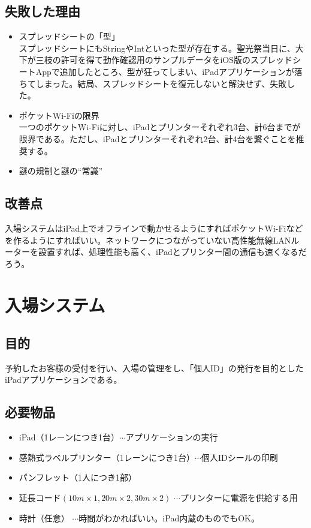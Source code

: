 \documentclass[dvipdfmx,jb5]{jreport}
\begin{document}
\subsection{失敗した理由}
\begin{itemize}
      \item スプレッドシートの「型」\\
            スプレッドシートにもStringやIntといった型が存在する。聖光祭当日に、大下が三枝の許可を得て動作確認用のサンプルデータをiOS版のスプレッドシートAppで追加したところ、型が狂ってしまい、iPadアプリケーションが落ちてしまった。結局、スプレッドシートを復元しないと解決せず、失敗した。
      \item ポケットWi-Fiの限界\\
            一つのポケットWi-Fiに対し、iPadとプリンターそれぞれ3台、計6台までが限界である。ただし、iPadとプリンターそれぞれ2台、計4台を繋ぐことを推奨する。
      \item 謎の規制と謎の``常識''
\end{itemize}

\subsection{改善点}
入場システムはiPad上でオフラインで動かせるようにすればポケットWi-Fiなどを作るようにすればいい。ネットワークにつながっていない高性能無線LANルーターを設置すれば、処理性能も高く、iPadとプリンター間の通信も速くなるだろう。
\section{入場システム}
\subsection{目的}
予約したお客様の受付を行い、入場の管理をし、「個人ID」の発行を目的としたiPadアプリケーションである。
\subsection{必要物品}
\begin{itemize}
      \item iPad（1レーンにつき1台）$\cdots$アプリケーションの実行
      \item 感熱式ラベルプリンター（1レーンにつき1台）$\cdots$個人IDシールの印刷
      \item パンフレット（1人につき1部）
      \item 延長コード$(10m\times1,20m\times2,30m\times2)$ $\cdots$プリンターに電源を供給する用
      \item 時計（任意） $\cdots$時間がわかればいい。iPad内蔵のものでもOK。
\end{itemize}
\end{document}
